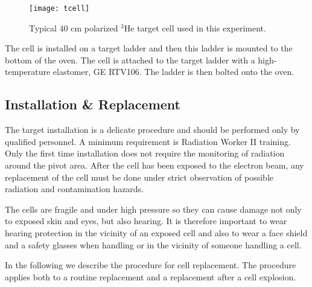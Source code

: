 \begin{figure}[t]
\begin{center}
\centerline{\texttt{[image: tcell]}}
\end{center}
\caption{Typical 40 cm polarized $^3$He target cell used in this
experiment.}
\label{fig:cell1}
\end{figure}

The cell is installed on a target ladder and then this ladder is mounted to the bottom of the oven.  The cell is attached to the target ladder with a high-temperature elastomer, GE RTV106.  The ladder is then bolted onto the oven.


\subsection{Installation \& Replacement}

\begin{safetyen}{10}{5}
The target installation is a delicate procedure and should be
performed only by qualified personnel. A minimum requirement is
Radiation Worker II training.  Only the first time installation does
not require the monitoring of radiation around the pivot area. After
the cell has been exposed to the electron beam, any replacement of the
cell must be done under strict observation of possible radiation and
contamination hazards.

The cells are fragile and under high pressure so they
can cause damage not only to exposed skin and eyes, but also hearing.  It is therefore important to wear hearing protection in the vicinity of an
exposed cell and also to wear a face shield and a safety glasses when handling or in the vicinity of someone handling a cell.

\end{safetyen}

In the following we describe the procedure for cell replacement. The
procedure applies both to a routine replacement and a replacement
after a cell  explosion.

